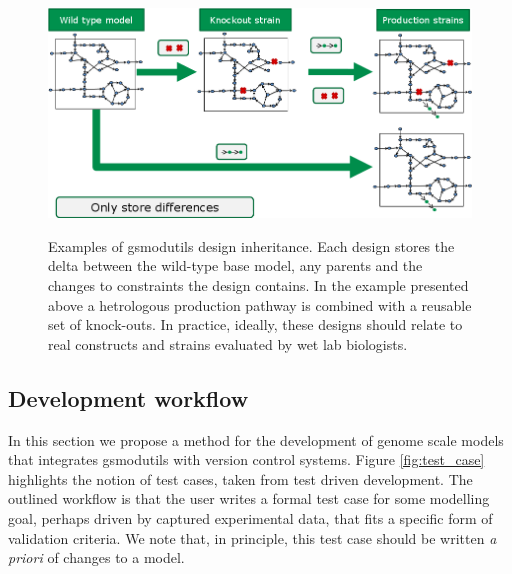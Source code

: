 \documentclass[a4paper,10pt]{article}
\begin{document}
\begin{figure}
  \includegraphics[width=\textwidth]{inheritence.png}
  \label{fig:strain_hered}
  \caption{Examples of gsmodutils design inheritance.
  Each design stores the delta between the wild-type base model, any parents and the changes to constraints the design contains.
  In the example presented above a hetrologous production pathway is combined with a reusable set of knock-outs.
  In practice, ideally, these designs should relate to real constructs and strains evaluated by wet lab biologists.
  }
\end{figure}

\subsection{Development workflow}
In this section we propose a method for the development of genome scale models that integrates gsmodutils with version control systems.
Figure \ref{fig:test_case} highlights the notion of test cases, taken from test driven development.
The outlined workflow is that the user writes a formal test case for some modelling goal, perhaps driven by captured experimental data, that fits a specific form of validation criteria.
We note that, in principle, this test case should be written \textit{a priori} of changes to a model.
\end{document}
